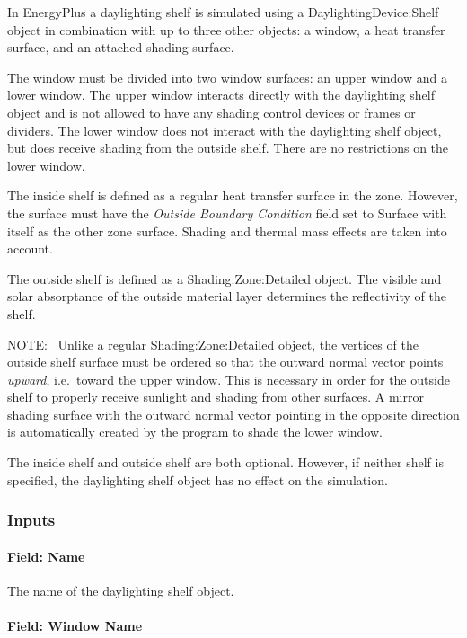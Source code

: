 In EnergyPlus a daylighting shelf is simulated using a DaylightingDevice:Shelf object in combination with up to three other objects: a window, a heat transfer surface, and an attached shading surface.

The window must be divided into two window surfaces: an upper window and a lower window. The upper window interacts directly with the daylighting shelf object and is not allowed to have any shading control devices or frames or dividers. The lower window does not interact with the daylighting shelf object, but does receive shading from the outside shelf. There are no restrictions on the lower window.

The inside shelf is defined as a regular heat transfer surface in the zone. However, the surface must have the \emph{Outside Boundary Condition} field set to Surface with itself as the other zone surface. Shading and thermal mass effects are taken into account.

The outside shelf is defined as a Shading:Zone:Detailed object. The visible and solar absorptance of the outside material layer determines the reflectivity of the shelf.

NOTE:~ Unlike a regular Shading:Zone:Detailed object, the vertices of the outside shelf surface must be ordered so that the outward normal vector points \emph{upward}, i.e.~toward the upper window. This is necessary in order for the outside shelf to properly receive sunlight and shading from other surfaces. A mirror shading surface with the outward normal vector pointing in the opposite direction is automatically created by the program to shade the lower window.

The inside shelf and outside shelf are both optional. However, if neither shelf is specified, the daylighting shelf object has no effect on the simulation.

\subsubsection{Inputs}\label{inputs-7-005}

\paragraph{Field: Name}\label{field-name-4-006}

The name of the daylighting shelf object.

\paragraph{Field: Window Name}\label{field-window-name-1}

